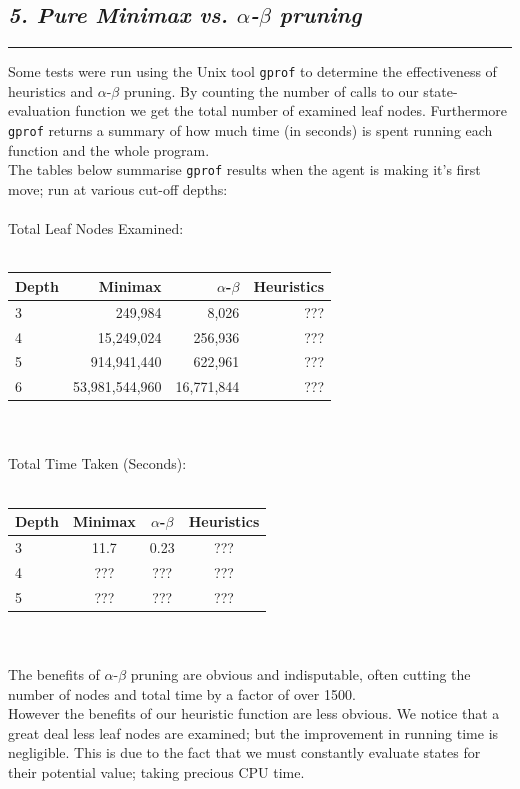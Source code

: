 \documentclass[10pt]{article}
\begin{document}
\begin{multicols}{2}
\subsection*{\emph { \textmd{5. Pure Minimax vs. $\alpha$-$\beta$ pruning}}}
\hrule
\vspace{0.4cm}
Some tests were run using the Unix tool \texttt{gprof} to determine the effectiveness
of heuristics and $\alpha$-$\beta$ pruning. By counting the number of calls
to our state-evaluation function we get the total number of examined leaf nodes.
Furthermore \texttt{gprof} returns a summary of how much time (in seconds) is spent running
each function and the whole program.\\
The tables below summarise \texttt{gprof} results when the agent is making it's first move;
run at various cut-off depths:\\\\
Total Leaf Nodes Examined:\\\\
\begin{tabular}{ | l | r r r | }
  \hline                        
  Depth & Minimax & $\alpha$-$\beta$ & Heuristics \\ \hline
  3 & 249,984 & 8,026 & ??? \\
  4 & 15,249,024 & 256,936 & ??? \\
  5 & 914,941,440 & 622,961 & ??? \\
  6 & 53,981,544,960 & 16,771,844 & ??? \\
  \hline  
\end{tabular}\\\\
Total Time Taken (Seconds):\\\\
\begin{tabular}{ | l | c c c | }
  \hline                        
  Depth & Minimax & $\alpha$-$\beta$ & Heuristics \\ \hline
  3 & 11.7 & 0.23 & ??? \\
  4 & ??? & ??? & ??? \\
  5 & ??? & ??? & ??? \\
  \hline  
\end{tabular}\\\\
The benefits of $\alpha$-$\beta$ pruning are obvious and indisputable, often cutting
the number of nodes and total time by a factor of over 1500.\\
However the benefits of our heuristic function are less obvious. We notice that
a great deal less leaf nodes are examined; but the improvement in running time is
negligible. This is due to the fact that we must constantly evaluate states for their
potential value; taking precious CPU time.


\end{multicols}
\end{document}
